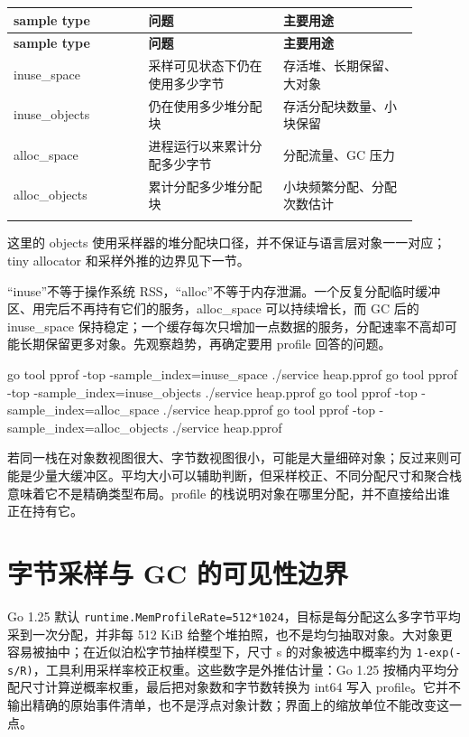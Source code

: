 \documentclass[UTF8,fontset=fandol,openany,11pt]{ctexbook}
\begin{document}
\begingroup\small\setlength{\tabcolsep}{4pt}
\begin{longtable}{>{\raggedright\arraybackslash}p{0.298\linewidth}>{\raggedright\arraybackslash}p{0.298\linewidth}>{\raggedright\arraybackslash}p{0.298\linewidth}}
\toprule
\textbf{sample type} & \textbf{问题} & \textbf{主要用途} \\
\midrule
\endfirsthead
\toprule
\textbf{sample type} & \textbf{问题} & \textbf{主要用途} \\
\midrule
\endhead
inuse\_space & 采样可见状态下仍在使用多少字节 & 存活堆、长期保留、大对象 \\
\addlinespace[3pt]
inuse\_objects & 仍在使用多少堆分配块 & 存活分配块数量、小块保留 \\
\addlinespace[3pt]
alloc\_space & 进程运行以来累计分配多少字节 & 分配流量、GC 压力 \\
\addlinespace[3pt]
alloc\_objects & 累计分配多少堆分配块 & 小块频繁分配、分配次数估计 \\
\addlinespace[3pt]
\bottomrule
\end{longtable}
\endgroup
这里的 objects 使用采样器的堆分配块口径，并不保证与语言层对象一一对应；tiny allocator 和采样外推的边界见下一节。

“inuse”不等于操作系统 RSS，“alloc”不等于内存泄漏。一个反复分配临时缓冲区、用完后不再持有它们的服务，alloc\_space 可以持续增长，而 GC 后的 inuse\_space 保持稳定；一个缓存每次只增加一点数据的服务，分配速率不高却可能长期保留更多对象。先观察趋势，再确定要用 profile 回答的问题。

\begin{codeblock}
go tool pprof -top -sample_index=inuse_space ./service heap.pprof
go tool pprof -top -sample_index=inuse_objects ./service heap.pprof
go tool pprof -top -sample_index=alloc_space ./service heap.pprof
go tool pprof -top -sample_index=alloc_objects ./service heap.pprof
\end{codeblock}

若同一栈在对象数视图很大、字节数视图很小，可能是大量细碎对象；反过来则可能是少量大缓冲区。平均大小可以辅助判断，但采样校正、不同分配尺寸和聚合栈意味着它不是精确类型布局。profile 的栈说明对象在哪里分配，并不直接给出谁正在持有它。

\section{字节采样与 GC 的可见性边界}
Go 1.25 默认 \texttt{runtime.\allowbreak{}MemProfile\allowbreak{}Rate=512*1024}，目标是每分配这么多字节平均采到一次分配，并非每 512 KiB 给整个堆拍照，也不是均匀抽取对象。大对象更容易被抽中；在近似泊松字节抽样模型下，尺寸 s 的对象被选中概率约为 \texttt{1-\allowbreak{}exp(-\allowbreak{}s/\allowbreak{}R)}，工具利用采样率校正权重。这些数字是外推估计量：Go 1.25 按桶内平均分配尺寸计算逆概率权重，最后把对象数和字节数转换为 int64 写入 profile。它并不输出精确的原始事件清单，也不是浮点对象计数；界面上的缩放单位不能改变这一点。\cite{tools-mprof}
\end{document}
